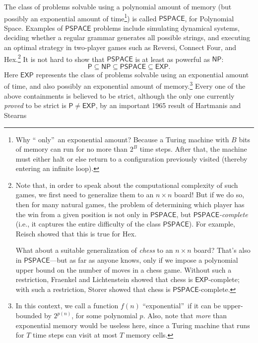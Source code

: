 \documentclass[12pt,onecolumn]{article}%
\begin{document}
The class of problems solvable using a polynomial amount of memory (but
possibly an exponential amount of time\footnote{Why \textquotedblleft
only\textquotedblright\  an exponential amount? Because a Turing machine with
$B$ bits of memory can run for no more than $2^{B}$ time steps. After
that, the machine must either halt or else return to a configuration
previously visited (thereby entering an infinite loop).}) is called
$\mathsf{PSPACE}$, for Polynomial Space. Examples of $\mathsf{PSPACE}%
$ problems include simulating dynamical systems, deciding whether a regular
grammar generates all possible strings, and executing an optimal strategy in
two-player games such as Reversi, Connect Four, and
Hex.\footnote{\label{chessnote}Note that, in order to speak about the
computational complexity of such games, we first need to generalize them to an
$n\times n$ board! But if we do so, then for many natural games, the
problem of determining which player has the win from a given position is not
only in $\mathsf{PSPACE}$, but $\mathsf{PSPACE}$\textit{-complete} (i.e., it
captures the entire difficulty of the class $\mathsf{PSPACE}$). For example,
Reisch \cite{reisch} showed that this is true for Hex.
\par
What about a suitable generalization of \textit{chess} to an $n\times
n$ board? That's also in $\mathsf{PSPACE}$---but as far as anyone knows,
only if we impose a polynomial upper bound on the number of moves in a chess
game. Without such a restriction, Fraenkel and Lichtenstein \cite{fraenkel}
showed that chess is $\mathsf{EXP}$-complete; with such a restriction, Storer
\cite{storer} showed that chess is $\mathsf{PSPACE}$-complete.} It is not
hard to show that $\mathsf{PSPACE}$ is at least as powerful as $\mathsf{NP}$:%
\[
\mathsf{P}\subseteq\mathsf{NP}\subseteq\mathsf{PSPACE}\subseteq\mathsf{EXP}.
\]
Here $\mathsf{EXP}$ represents the class of problems solvable using an
exponential amount of time, and also possibly an exponential amount of
memory.\footnote{In this context, we call a function $f(  n)
$ \textquotedblleft exponential\textquotedblright\  if it can be upper-bounded
by $2^{p(  n)  }$, for some polynomial $p$. Also, note that
\textit{more} than exponential memory would be useless here, since a Turing
machine that runs for $T$ time steps can visit at most $T$ memory cells.}
 Every one of the above containments is believed to be strict, although the
only one currently \textit{proved} to be strict is $\mathsf{P}\neq
\mathsf{EXP}$, by an important 1965 result of Hartmanis and Stearns
\end{document}
